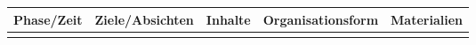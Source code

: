 \documentclass[paper=a4,notitlepage,paper=landscape]{article}
\newlength{\boxseparator}
\begin{document}
	\renewcommand*{\arraystretch}{1.25}
	\noindent
	\begin{tabularx}{\textwidth}{|L{0.124}|L{0.245}|L{0.32}|L{0.17}|X|}
		\hline
		Phase/Zeit&	Ziele/Absichten	&Inhalte	&Organisationsform	&Materialien\\
		\hline
		&&&&\\
		\hline
	\end{tabularx}\\
\end{document}
